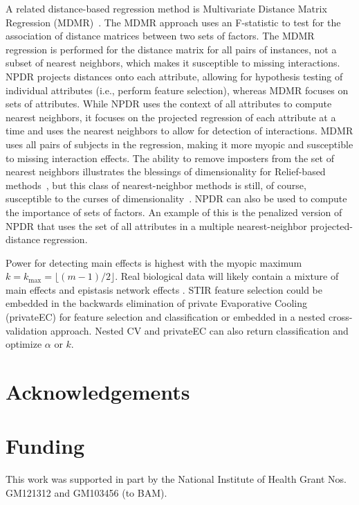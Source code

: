 \documentclass[10pt]{article}
\begin{document}
A related distance-based regression method is Multivariate Distance Matrix Regression (MDMR)~\cite{schork12}. The MDMR approach uses an F-statistic to test for the association of distance matrices between two sets of factors. The MDMR regression is performed for the distance matrix for all pairs of instances, not a subset of nearest neighbors, which makes it susceptible to missing interactions. NPDR projects distances onto each attribute, allowing for hypothesis testing of individual attributes (i.e., perform feature selection), whereas MDMR focuses on sets of attributes. While NPDR uses the context of all attributes to compute nearest neighbors, it focuses on the projected regression of each attribute at a time and uses the nearest neighbors to allow for detection of interactions. MDMR uses all pairs of subjects in the regression, making it more myopic and susceptible to missing interaction effects. The ability to remove imposters from the set of nearest neighbors illustrates the blessings of dimensionality for Relief-based methods~\cite{bod}, but this class of nearest-neighbor methods is still, of course, susceptible to the curses of dimensionality~\cite{CoD}. NPDR can also be used to compute the importance of sets of factors. An example of this is the penalized version of NPDR that uses the set of all attributes in a multiple nearest-neighbor projected-distance regression.

Power for detecting main effects is highest with the myopic maximum $k=k_{\text{max}}=\lfloor (m-1)/2\rfloor$. Real biological data will likely contain a mixture of main effects and epistasis network effects \cite{mckinney_pajewski}. STIR feature selection could be embedded in the backwards elimination of private Evaporative Cooling (privateEC) for feature selection and classification \cite{le17} or embedded in a nested cross-validation approach. Nested CV and privateEC can also return classification and optimize $\alpha$ or $k$. 

\section*{Acknowledgements}

\section*{Funding}
This work was supported in part by the National Institute of Health Grant Nos. GM121312 and GM103456 (to BAM). 


%

\end{document}

